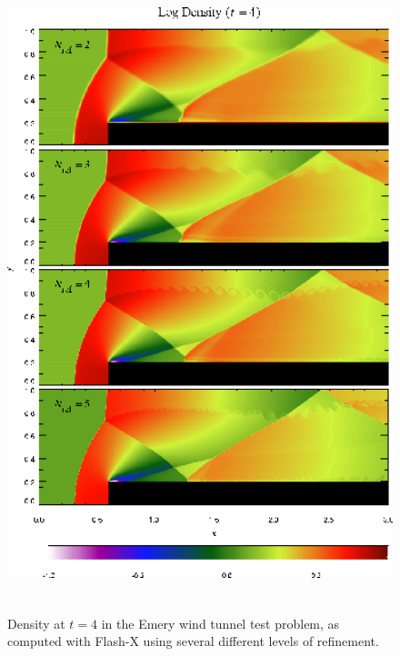 \begin{figure}
\begin{center}
{\leavevmode\includegraphics[height=7in]{WindTunnel_compare}}
\end{center}
\caption{\label{Fig:Wind tunnel comparison} Density at $t=4$ in the Emery
wind tunnel test problem, as computed with Flash-X using several different
levels of refinement.
}
\end{figure}

